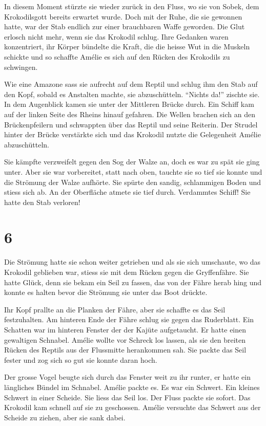 \documentclass[11pt,titlepage,a5paper]{book}
\begin{document}
In diesem Moment stürzte sie wieder zurück in den Fluss, wo sie von Sobek, dem Krokodilsgott bereits erwartet wurde. Doch mit der Ruhe, die sie gewonnen hatte, war der Stab endlich zur einer brauchbaren Waffe geworden. Die Glut erlosch nicht mehr, wenn sie das Krokodil schlug. Ihre Gedanken waren konzentriert, ihr Körper bündelte die Kraft, die die heisse Wut in die Muskeln schickte und so schaffte Amélie es sich auf den Rücken des Krokodils zu schwingen.

Wie eine Amazone sass sie aufrecht auf dem Reptil und schlug ihm den Stab auf den Kopf, sobald es Anstalten machte, sie abzuschütteln. "`Nichts da!"' zischte sie. In dem Augenblick kamen sie unter der Mittleren Brücke durch. Ein Schiff kam auf der linken Seite des Rheins hinauf gefahren. Die Wellen brachen sich an den Brückenpfeilern und schwappten über das Reptil und seine Reiterin. Der Strudel hinter der Brücke verstärkte sich und das Krokodil nutzte die Gelegenheit Amélie abzuschütteln. 

Sie kämpfte verzweifelt gegen den Sog der Walze an, doch es war zu spät sie ging unter. Aber sie war vorbereitet, statt nach oben, tauchte sie so tief sie konnte und die Strömung der Walze aufhörte. Sie spürte den sandig, schlammigen Boden und stiess sich ab. An der Oberfläche atmete sie tief durch. Verdammtes Schiff! Sie hatte den Stab verloren! 


\section*{6}


Die Strömung hatte sie schon weiter getrieben und als sie sich umschaute, wo das Krokodil geblieben war, stiess sie mit dem Rücken gegen die Gryffenfähre. Sie hatte Glück, denn sie bekam ein Seil zu fassen, das von der Fähre herab hing und konnte es halten bevor die Strömung sie unter das Boot drückte.

Ihr Kopf prallte an die Planken der Fähre, aber sie schaffte es das Seil festzuhalten. Am hinteren Ende der Fähre schlug sie gegen das Ruderblatt. Ein Schatten war im hinteren Fenster der der Kajüte aufgetaucht. Er hatte einen gewaltigen Schnabel. Amélie wollte vor Schreck los lassen, als sie den breiten Rücken des Reptils aus der Flussmitte herankommen sah. Sie packte das Seil fester und zog sich so gut sie konnte daran hoch.

Der grosse Vogel beugte sich durch das Fenster weit zu ihr runter, er hatte ein längliches Bündel im Schnabel. Amélie packte es. Es war ein Schwert. Ein kleines Schwert in einer Scheide. Sie liess das Seil los. Der Fluss packte sie sofort. Das Krokodil kam schnell auf sie zu geschossen. Amélie versuchte das Schwert aus der Scheide zu ziehen, aber sie sank dabei. 
\end{document}
